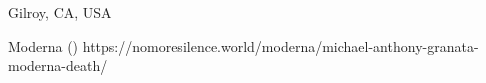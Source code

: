           {
            Gilroy, CA, USA
          }
          {
            
          }
          {
            Moderna
          }
          {
          }
          {
             ()
          }
          {
            https://nomoresilence.world/moderna/michael-anthony-granata-moderna-death/
          }

